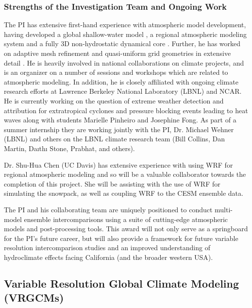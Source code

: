 \documentclass[11pt]{article}
\begin{document}
\subsubsection{Strengths of the Investigation Team and Ongoing Work}
The PI has extensive first-hand experience with atmospheric model development, having developed a global shallow-water model \citep{ullrich2010high}, a regional atmospheric modeling system \citep{ullrich2012operator} and a fully 3D non-hydrostatic dynamical core \citep{ullrich2012mcore}. Further, he has worked on adaptive mesh refinement and quasi-uniform grid geometries in extensive detail \citep{collins2013nonhydrostatic}. He is heavily involved in national collaborations on climate projects, and is an organizer on a number of sessions and workshops which are related to atmospheric modeling. In addition, he is closely affiliated with ongoing climate research efforts at Lawrence Berkeley National Laboratory (LBNL) and NCAR. He is currently working on the question of extreme weather detection and attribution for extratropical cyclones and pressure blocking events leading to heat waves along with students Marielle Pinheiro and Josephine Fong. As part of a summer internship they are working jointly with the PI, Dr. Michael Wehner (LBNL) and others on the LBNL climate research team (Bill Collins, Dan Martin, Daıthı Stone, Prabhat, and others).

Dr.  Shu-Hua Chen (UC Davis) has extensive experience with using WRF for regional atmospheric modeling and so will be a valuable collaborator towards the completion of this project. She will be assisting with the use of WRF for simulating the snowpack, as well as coupling WRF to the CESM ensemble data.

The PI and his collaborating team are uniquely positioned to conduct multi-model ensemble intercomparisons using a suite of cutting-edge atmospheric models and post-processing tools. This award will not only serve as a springboard for the PI’s future career, but will also provide a framework for future variable resolution intercomparison studies and an improved understanding of hydroclimate effects facing California (and the broader western USA).

\subsection{Variable Resolution Global Climate Modeling (VRGCMs)}
\end{document}

